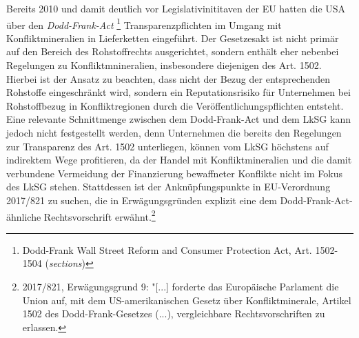 \documentclass[12pt,a4paper,oneside]{book} %
\begin{document}
{	Bereits 2010 und damit deutlich vor Legislativinititaven der EU hatten die USA über den \textit{Dodd-Frank-Act} \footnote{Dodd-Frank Wall Street Reform and Consumer Protection Act, Art. 1502-1504 (\textit{sections})} Transparenzpflichten im Umgang mit Konfliktmineralien in Lieferketten eingeführt. Der Gesetzesakt ist nicht primär auf den Bereich des Rohstoffrechts ausgerichtet, sondern enthält eher nebenbei Regelungen zu Konfliktmnineralien, insbesondere diejenigen des Art. 1502.  Hierbei ist der Ansatz zu beachten, dass nicht der Bezug der entsprechenden Rohstoffe eingeschränkt wird, sondern ein Reputationsrisiko für Unternehmen bei Rohstoffbezug in Konfliktregionen durch die Veröffentlichungspflichten entsteht.\autocite[Rn. 415]{ruttloff_lieferkettensorgfaltspflichtengesetz_2022} Eine relevante Schnittmenge zwischen dem Dodd-Frank-Act und dem LkSG kann jedoch nicht festgestellt werden, denn Unternehmen die bereits den Regelungen zur Transparenz des Art. 1502 unterliegen, können vom LkSG höchstens auf indirektem Wege profitieren, da der Handel mit Konfliktmineralien und die damit verbundene Vermeidung der Finanzierung bewaffneter Konflikte nicht im Fokus des LkSG stehen.\autocite[Rn 423]{ruttloff_lieferkettensorgfaltspflichtengesetz_2022} Stattdessen ist der Anknüpfungspunkte in EU-Verordnung 2017/821 zu suchen, die in Erwägungsgründen explizit eine dem Dodd-Frank-Act-ähnliche Rechtsvorschrift erwähnt.\footnote{2017/821, Erwägungsgrund 9: "[...] forderte das Europäische Parlament die Union auf, mit dem US-amerikanischen Gesetz über Konfliktminerale, Artikel 1502 des Dodd-Frank-Gesetzes (...), vergleichbare Rechtsvorschriften zu erlassen.} 
	
	
	
}
\end{document}
